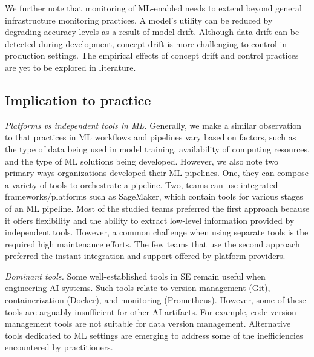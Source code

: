 We further note that monitoring of ML-enabled \DIFdelbegin {}\DIFdelend \DIFaddbegin {}\DIFaddend needs to extend beyond \DIFdelbegin {}\DIFdelend general infrastructure monitoring practices. A model's utility can be reduced by degrading accuracy levels as a result of model drift. Although data drift can be detected during \DIFaddbegin {}\DIFaddend development, concept drift is more challenging to control in production settings. The empirical effects of concept drift and control practices are yet to be explored in literature.


\subsection{Implication to practice}
\textit{Platforms vs \DIFdelbegin {}\DIFdelend independent tools in ML.} Generally, we make a similar observation to \cite{Doris2021MLPipelines} that practices in ML workflows and pipelines vary based on factors, such as the type of data being used in model training, availability of computing resources, and the type of ML solutions being developed. However, we also note two primary ways organizations developed their ML pipelines. One, they can compose a variety of tools to orchestrate a pipeline. Two, teams can use integrated frameworks/platforms such as SageMaker, which contain \DIFdelbegin {}\DIFdelend \DIFaddbegin {}\DIFaddend tools for various stages of an ML pipeline. Most of the studied teams preferred the first approach because it offers flexibility and the ability to extract low-level information provided by independent tools. However, a common challenge when using separate tools is the required high maintenance efforts. The few teams that use the second approach preferred the instant integration and support offered by platform providers.

\textit{Dominant tools.} Some well-established tools in SE remain useful when engineering AI systems. Such tools relate to version management (Git), containerization (Docker), and monitoring (Prometheus). However, some of these tools are arguably insufficient for other AI artifacts. For example, code version management tools are not suitable for data version management. Alternative tools dedicated to ML settings are emerging to address some of the inefficiencies encountered by practitioners. %

